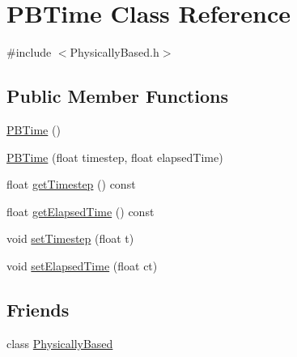 \hypertarget{class_p_b_time}{\section{P\-B\-Time Class Reference}
\label{class_p_b_time}
}


{\ttfamily \#include $<$Physically\-Based.\-h$>$}

\subsection*{Public Member Functions}
\begin{DoxyCompactItemize}
\item 
\hyperlink{class_p_b_time_a09bdd4a9e468b5582f0c675ad6237c4e}{P\-B\-Time} ()
\item 
\hyperlink{class_p_b_time_a695ca9cad69059a0793b4b3c69e25151}{P\-B\-Time} (float timestep, float elapsed\-Time)
\item 
float \hyperlink{class_p_b_time_a1bf628d33c9577d5f6b51c2394dbe3a5}{get\-Timestep} () const 
\item 
float \hyperlink{class_p_b_time_abbb62704149b7c9069d120e32333700e}{get\-Elapsed\-Time} () const 
\item 
void \hyperlink{class_p_b_time_a31494e412baefed4c000747ae7604eb5}{set\-Timestep} (float t)
\item 
void \hyperlink{class_p_b_time_a46d60a843cf2e910854ab9fb491e783a}{set\-Elapsed\-Time} (float ct)
\end{DoxyCompactItemize}
\subsection*{Friends}
\begin{DoxyCompactItemize}
\item 
class \hyperlink{class_p_b_time_aeee6bd23afed3d408fb21a7d857a8f3b}{Physically\-Based}
\end{DoxyCompactItemize}


